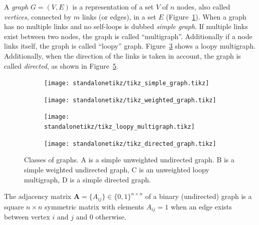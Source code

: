 A \emph{graph} $G=(V,E)$ is a representation of a set $V$ of $n$ nodes, also called \emph{vertices}, connected by $m$ links (or edges), in a set $E$ (Figure~\ref{fig:simple_unweighted_graph}). When a graph has no multiple links and no self-loops is dubbed \emph{simple graph}.
If multiple links exist between two nodes, the graph is called ``multigraph''. Additionally if a node links itself, the graph is called ``loopy'' graph. Figure~\ref{fig:loopy_multigraph} shows a loopy multigraph. Additionally, when the direction of the links is taken in account, the graph is called \emph{directed}, as shown in Figure~\ref{fig:directedgraph}.

\noindent\begin{figure}[htb!]
\centering
	\begin{subfigure}[b]{0.4\textwidth}%
		\texttt{[image: standalonetikz/tikz\_simple\_graph.tikz]}
		\caption{}
		\label{fig:simple_unweighted_graph}
	\end{subfigure}%
	\begin{subfigure}[b]{0.4\textwidth}%
	\texttt{[image: standalonetikz/tikz\_weighted\_graph.tikz]}
	\caption{}
	\label{fig:simple_weighted_graph}
	\end{subfigure}

	\begin{subfigure}[b]{0.4\textwidth}%
	\texttt{[image: standalonetikz/tikz\_loopy\_multigraph.tikz]}
	\caption{}
	\label{fig:loopy_multigraph}
	\end{subfigure}%
	\begin{subfigure}[b]{0.4\textwidth}%
	\texttt{[image: standalonetikz/tikz\_directed\_graph.tikz]}
	\caption{}
	\label{fig:directedgraph}
	\end{subfigure}
	\caption{Classes of graphs. A is a simple unweighted undirected graph. B is a simple weighted undirected graph, C is an unweighted loopy multigraph, D is a simple directed graph.}
\end{figure}

The adjacency matrix $\mathbf{A}=\{A_{ij}\} \in \{0,1\}^{n \times n}$ of a binary (undirected) graph is a square $n\times n$ symmetric matrix with elements $A_{ij}=1$ when an edge exists between vertex $i$ and $j$ and $0$ otherwise.

